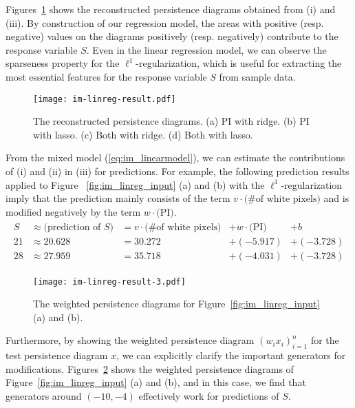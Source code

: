 \documentclass[smallextended]{svjour3}
\begin{document}
Figures~\ref{fig:ridge_lasso} shows the reconstructed persistence diagrams obtained from (i) and (iii). By construction of our regression model, the areas with  positive (resp. negative) values on the diagrams positively (resp. negatively) contribute to the response variable $S$. Even in the linear regression model, we can observe the sparseness property for the $\ell^1$-regularization, which is useful for extracting the most essential features for the response variable $S$ from sample data. 


\begin{figure}[htbp]
  \centering
  \texttt{[image: im-linreg-result.pdf]}
  \caption{The reconstructed persistence diagrams. (a) PI with ridge. (b) PI with lasso. (c) Both with ridge. (d) Both with lasso.}
  \label{fig:ridge_lasso}
\end{figure}


From the mixed model (\ref{eq:im_linearmodel}), we can estimate the contributions of (i) and (ii) in (iii) for predictions. For example, the following prediction results applied to Figure ~\ref{fig:im_linreg_input} (a) and (b) with the $\ell^1$-regularization imply that the prediction mainly consists of
the term $v\cdot\textrm{(\# of white pixels)}$ and is modified negatively by
the term $w \cdot \textrm{(PI)}$. 
\begin{align*}
  \begin{array}{lllll}
    S & \approx
        \mbox{(prediction of $S$)} & = v\cdot\textrm{(\# of white pixels)} &+ w \cdot \textrm{(PI)} &+  b  \\
    21 &\approx 20.628 &= 30.272 &+  (-5.917) &+  (-3.728) \\
    28 &\approx 27.959 &= 35.718 &+  (-4.031) &+  (-3.728)   
  \end{array}
\end{align*}

\begin{figure}[htbp]
  \centering
  \texttt{[image: im-linreg-result-3.pdf]}
  \caption{The weighted persistence diagrams for
    Figure~\ref{fig:im_linreg_input} (a) and (b).}
  \label{fig:im_lasso_weights}
\end{figure}


Furthermore, by showing the weighted persistence diagram $(w_ix_i)_{i=1}^{n}$ for the test persistence diagram $x$, we can explicitly clarify the important generators for modifications. 
Figures~\ref{fig:im_lasso_weights}  shows the weighted persistence diagrams of Figure~\ref{fig:im_linreg_input} (a) and (b), and in this case, we find that generators around $(-10, -4)$ effectively work for predictions of $S$.
\end{document}
